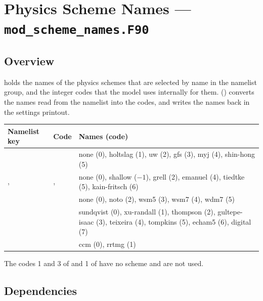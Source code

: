 \section{Physics Scheme Names --- \texttt{mod\_scheme\_names.F90}}
\label{sec:schemenames}

\subsection{Overview}

 holds the names of the physics schemes that are
selected by name in the  namelist group, and the
integer codes that the model uses internally for them. 
() converts the names read from the namelist
into the codes, and writes the names back in the settings printout.

\begin{longtable}{L{3.2cm} L{2.2cm} L{8.6cm}}
  \toprule
  \textbf{Namelist key} & \textbf{Code} & \textbf{Names (code)} \\
  \midrule
  \endhead
  \bottomrule
  \endfoot
   &  &
    none (0), holtslag (1), uw (2), gfs (3), myj (4), shin-hong (5) \\
  ,  &
    ,  &
    none (0), shallow ($-1$), grell (2), emanuel (4), tiedtke (5),
    kain-fritsch (6) \\
   &  &
    none (0), noto (2), wsm5 (3), wsm7 (4), wdm7 (5) \\
   &  &
    sundqvist (0), xu-randall (1), thompson (2), gultepe-isaac (3),
    teixeira (4), tompkins (5), echam5 (6), digital (7) \\
   &  & ccm (0), rrtmg (1) \\
\end{longtable}

\noindent The codes 1 and 3 of  and 1 of  have
no scheme and are not used.

\subsection{Dependencies}

